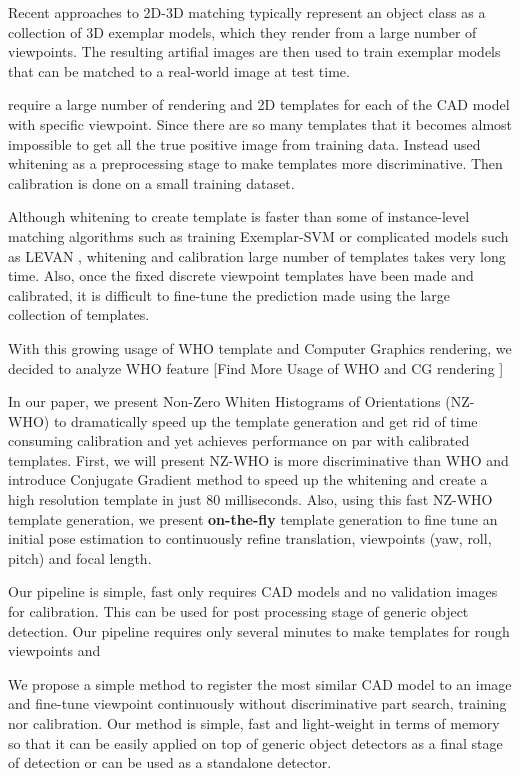 Recent approaches to 2D-3D matching typically represent an object
class as a collection of 3D exemplar models, which they render from a
large number of viewpoints. The resulting artifial images are then
used to train exemplar models that can be matched to a real-world
image at test time.


\cite{Aubry14, Lim14} require a large number of rendering and 2D
templates for each of the CAD model with specific viewpoint. Since
there are so many templates that it becomes almost impossible to get
all the true positive image from training data. Instead \cite{Aubry14,
  Lim14} used whitening as a preprocessing stage \cite{Hariharan12} to
make templates more discriminative. Then calibration is done on a
small training dataset.

Although whitening to create template is faster than some of
instance-level matching algorithms such as training Exemplar-SVM
\cite{Malisiewicz11} or complicated models such as LEVAN
\cite{Divvala14}, whitening and calibration large number of templates
takes very long time. Also, once the fixed discrete viewpoint
templates have been made and calibrated, it is difficult to fine-tune
the prediction made using the large collection of templates.


With this growing usage of WHO template and Computer Graphics
rendering, we decided to analyze WHO feature
[Find More Usage of WHO and CG rendering \cite{Pepik12}]


In our paper, we present Non-Zero Whiten Histograms of Orientations
(NZ-WHO) to dramatically speed up the template generation and get rid
of time consuming calibration and yet achieves performance on par with
calibrated templates. First, we will present NZ-WHO is more
discriminative than WHO and introduce Conjugate Gradient method to
speed up the whitening and create a high resolution template in just
80 milliseconds. Also, using this fast NZ-WHO template generation, we
present \textbf{on-the-fly} template generation to fine tune an
initial pose estimation to continuously refine translation, viewpoints
(yaw, roll, pitch) and focal length.


Our pipeline is simple, fast only requires CAD models and no
validation images for calibration. This can be used for post
processing stage of generic object detection. Our pipeline requires
only several minutes to make templates for rough viewpoints and 


We propose a simple method to register the most similar CAD model to
an image and fine-tune viewpoint continuously without discriminative
part search, training nor calibration. Our method is simple, fast and
light-weight in terms of memory so that it can be easily applied on
top of generic object detectors as a final stage of detection or can
be used as a standalone detector. 



